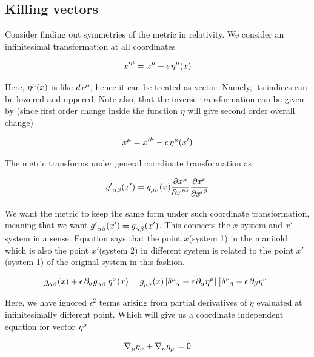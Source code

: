 \documentclass{report}
\begin{document}
\subsection{Killing vectors}
\label{sec:killing}

Consider finding out symmetries of the metric in relativity. We consider an infinitesimal transformation at all coordinates

$${x'}\indices{^\mu} = x\indices{^\mu} + \epsilon \, \eta\indices{^\mu}(x)$$

\noindent Here, $\eta\indices{^\mu}(x)$ is like $dx\indices{^\mu}$, hence it can be treated as vector. Namely, its indices can be lowered and uppered. Note also, that the inverse transformation can be given by (since first order change inside the function $\eta$ will give second order overall change)


$$x\indices{^\mu} = {x'}\indices{^\mu} - \epsilon \, \eta\indices{^\mu}(x')$$

\noindent The metric transforms under general coordinate transformation as 

$${g'}\indices{_\alpha_ \beta}(x') = g\indices{_\mu _\nu}(x)\frac{\partial x\indices{^\mu}}{\partial {x'}\indices{^\alpha}} \frac{\partial x\indices{^\nu}}{\partial {x'}\indices{^\beta}}$$

\noindent We want the metric to keep the same form under such coordinate transformation, meaning that we want ${g'}\indices{_\alpha_ \beta}(x') = g\indices{_\alpha_ \beta}(x')$. This connects the $x$ system and $x'$ system in a sense. Equation says that the point $x$(system 1) in the manifold which is also the point $x'$(system 2) in different system is related to the point $x'$(system 1) of the original system in this fashion. 

$$g\indices{_\alpha_ \beta}(x) + \epsilon \, \partial_\sigma g\indices{_\alpha_ \beta} \, \eta\indices{^\sigma}(x)= g\indices{_\mu_ \nu}(x) \left[\delta\indices{^\mu_\alpha} -\epsilon \, \partial_\alpha\eta\indices{^\mu}\right] \left[\delta\indices{^\nu_ \beta} -\epsilon \, \partial_ \beta\eta\indices{^\nu}\right]  $$

\noindent Here, we have ignored $\epsilon^2$ terms arising from partial derivatives of $\eta$ evaluated at infinitesimally different point. Which will give us a coordinate independent equation for vector $\eta\indices{^\mu}$

\begin{equation}
\nabla\indices{_\mu}\eta\indices{_\nu} + \nabla\indices{_\nu}\eta\indices{_\mu} = 0 
\end{equation}
\end{document}
